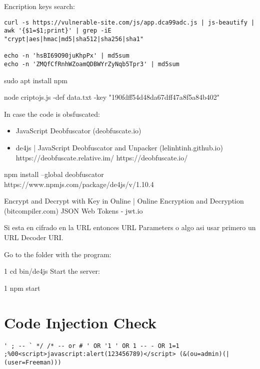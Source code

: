 Encription keys search:
\begin{lstlisting}[numbers=none]
curl -s https://vulnerable-site.com/js/app.dca99adc.js | js-beautify | awk '{$1=$1;print}' | grep -iE  "crypt|aes|hmac|md5|sha512|sha256|sha1"

echo -n 'hsBI69O90juKhpPx' | md5sum 
echo -n 'ZMQfCfRnhWZoamQDBWYrZyNqb5Tpr3' | md5sum
\end{lstlisting}

sudo apt install npm 


node criptojs.js -def data.txt -key "190fdff54d48da67dff47a8f5a84b402"

In case the code is obsfuscated:
\begin{itemize}
	\item JavaScript Deobfuscator (deobfuscate.io)
	\item de4js | JavaScript Deobfuscator and Unpacker (lelinhtinh.github.io)
		https://deobfuscate.relative.im/
         	https://deobfuscate.io/
\end{itemize}

npm install --global deobfuscator
https://www.npmjs.com/package/de4js/v/1.10.4

Encrypt and Decrypt with Key in Online | Online Encryption and Decryption (bitcompiler.com)
JSON Web Tokens - jwt.io

Si esta en cifrado en la URL entonces URL Parameters o algo asi usar primero un URL Decoder URI.

Go to the folder with the program:

1
cd bin/de4js
Start the server:

1
npm start

\section{Code Injection Check}

\begin{lstlisting}[numbers=none]
' ; -- ` */ /* -- or # ' OR '1 ' OR 1 -- - OR 1=1 ;%00<script>javascript:alert(123456789)</script> (&(ou=admin)(| (user=Freeman)))
\end{lstlisting}

